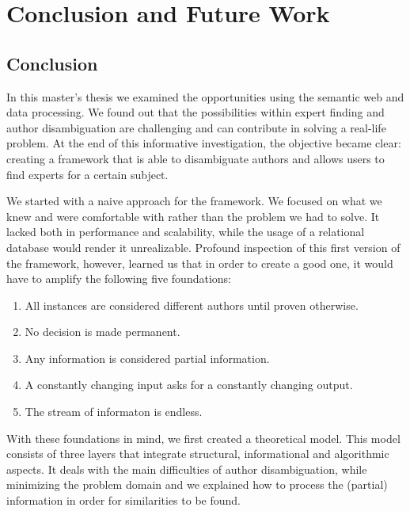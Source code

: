 \chapter{Conclusion and Future Work}


\section{Conclusion}

In this master's thesis we examined the opportunities using the semantic web and data processing. We found out that the possibilities within expert finding and author disambiguation are challenging and can contribute in solving a real-life problem. At the end of this informative investigation, the objective became clear: creating a framework that is able to disambiguate authors and allows users to find experts for a certain subject.


We started with a naive approach for the framework. We focused on what we knew and were comfortable with rather than the problem we had to solve. It lacked both in performance and scalability, while the usage of a relational database would render it unrealizable. Profound inspection of this first version of the framework, however, learned us that in order to create a good one, it would have to amplify the following five foundations:

\begin{enumerate}
	\item All instances are considered different authors until proven otherwise.
	\item No decision is made permanent.
	\item Any information is considered partial information.
	\item A constantly changing input asks for a constantly changing output.
	\item The stream of informaton is endless.
\end{enumerate}


With these foundations in mind, we first created a theoretical model. This model consists of three layers that integrate structural, informational and algorithmic aspects. It deals with the main difficulties of author disambiguation, while minimizing the problem domain and we explained how to process the (partial) information in order for similarities to be found. 

